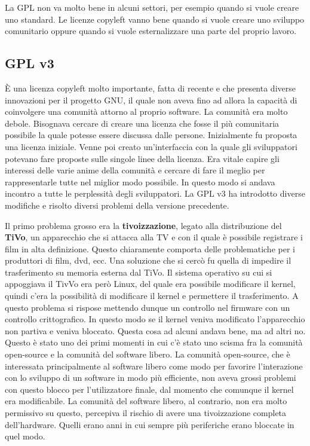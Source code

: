 La GPL non va molto bene in alcuni settori, per esempio quando si vuole creare uno standard. Le licenze copyleft vanno bene quando si vuole creare uno sviluppo comunitario oppure quando si vuole esternalizzare una parte del proprio lavoro. 

\subsection{GPL v3}

È una licenza copyleft molto importante, fatta di recente e che presenta diverse innovazioni per il progetto GNU, il quale non aveva fino ad allora la capacità di coinvolgere una comunità attorno al proprio software. La comunità era molto debole. Bisognava cercare di creare una licenza che fosse il più comunitaria possibile la quale potesse essere discussa dalle persone. Inizialmente fu proposta una licenza iniziale. Venne poi creato un'interfaccia con la quale gli sviluppatori potevano fare proposte sulle singole linee della licenza. Era vitale capire gli interessi delle varie anime della comunità e cercare di fare il meglio per rappresentarle tutte nel miglior modo possibile. In questo modo si andava incontro a tutte le perplessità degli sviluppatori. La GPL v3 ha introdotto diverse modifiche e risolto diversi problemi della versione precedente. 

Il primo problema grosso era la \textbf{tivoizzazione}, legato alla distribuzione del \textbf{TiVo}, un apparecchio che si attacca alla TV e con il quale è possibile registrare i film in alta definizione. Questo chiaramente comporta delle problematiche per i produttori di film, dvd, ecc. Una soluzione che si cercò fu quella di impedire il trasferimento su memoria esterna dal TiVo. Il sistema operativo su cui si appoggiava il TivVo era però Linux, del quale era possibile modificare il kernel, quindi c'era la possibilità di modificare il kernel e permettere il trasferimento. A questo problema si rispose mettendo dunque un controllo nel firmware con un controllo crittografico. In questo modo se il kernel veniva modificato l'apparecchio non partiva e veniva bloccato. Questa cosa ad alcuni andava bene, ma ad altri no. Questo è stato uno dei primi momenti in cui c'è stato uno scisma fra la comunità open-source e la comunità del software libero. La comunità open-source, che è interessata principalmente al software libero come modo per favorire l'interazione con lo sviluppo di un software in modo più efficiente, non aveva grossi problemi con questo blocco per l'utilizzatore finale, dal momento che comunque il kernel era modificabile. La comunità del software libero, al contrario, non era molto permissivo su questo, percepiva il rischio di avere una tivoizzazione completa dell'hardware. Quelli erano anni in cui sempre più periferiche erano bloccate in quel modo.

